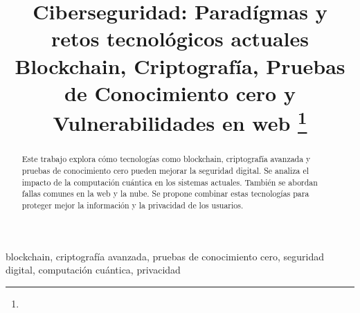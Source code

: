 \documentclass[conference]{IEEEtran}
\begin{document}
\title{Ciberseguridad: Paradígmas y retos tecnológicos actuales \\
{\footnotesize \textsuperscript{}Blockchain, Criptografía, Pruebas de Conocimiento cero y Vulnerabilidades en web}
\thanks{}
}

\author{
\and
{}
\and
{}
\and
{}
}

\maketitle

\begin{abstract}
Este trabajo explora cómo tecnologías como blockchain, criptografía avanzada y pruebas de conocimiento cero pueden mejorar la seguridad digital. Se analiza el impacto de la computación cuántica en los sistemas actuales. También se abordan fallas comunes en la web y la nube. Se propone combinar estas tecnologías para proteger mejor la información y la privacidad de los usuarios.
\end{abstract}

\renewcommand{\IEEEkeywordsname}{Palabras Clave} 

\begin{IEEEkeywords}
blockchain, criptografía avanzada, pruebas de conocimiento cero, seguridad digital, computación cuántica, privacidad
\end{IEEEkeywords}
\end{document}
